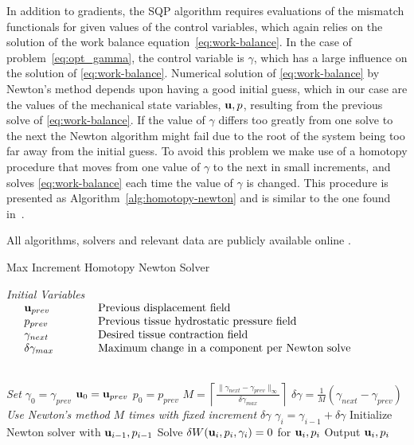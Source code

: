 In addition to gradients, the SQP algorithm requires evaluations of
the mismatch functionals for given values of the control variables,
which again relies on the solution of the work balance
equation~\eqref{eq:work-balance}. In the case of
problem~\eqref{eq:opt_gamma}, the control variable is $\gamma$, which
has a large influence on the solution of \eqref{eq:work-balance}.
Numerical solution of \eqref{eq:work-balance} by Newton's method
depends upon having a good initial guess, which in our case are the
values of the mechanical state variables, $\mathbf{u}, p$, resulting from
the previous solve of \eqref{eq:work-balance}. If the value of
$\gamma$ differs too greatly from one solve to the next the Newton
algorithm might fail due to the root of the system being too far away
from the initial guess. To avoid this problem we make use of a
homotopy procedure that moves from one value of $\gamma$ to the next
in small increments, and solves \eqref{eq:work-balance} each time the
value of $\gamma$ is changed.  This procedure is presented as
Algorithm~\ref{alg:homotopy-newton} and is similar to the one found
in~\cite{pezzuto2014orthotropic}. 

All algorithms, solvers and relevant data are
publicly available online \cite{OurPackage}.

\begin{algorithm}
\caption{Max Increment Homotopy Newton Solver}
\label{alg:homotopy-newton}
  \begin{algorithmic}
   \State \emph{Initial Variables}
   \State $\begin{array}{ll}
    \quad \mathbf{u}_{prev} & \quad \quad \quad  \mbox{Previous displacement field} \\
    \quad p_{prev} & \quad \quad \quad  \mbox{Previous tissue hydrostatic pressure field} \\
    \quad \gamma_{next} & \quad \quad \quad  \mbox{Desired tissue contraction field} \\
    \quad \delta \gamma_{max} & \quad \quad \quad  \mbox{Maximum change in a component per Newton solve}
   \end{array}$

   \\
   \State \emph{Set}
   \State \quad $\gamma_0 = \gamma_{prev}$
   \State \quad $\mathbf{u}_0 = \mathbf{u}_{prev}$
   \State \quad  $p_0 = p_{prev}$
   \State \quad  $M = \left \lceil \frac{\|\gamma_{next} - \gamma_{prev}\|_{\infty}}{\delta \gamma_{max}} \right \rceil$
   \State \quad $\delta \gamma = \frac{1}{M}(\gamma_{next} - \gamma_{prev})$
   \\
   \State \emph{Use Newton's method $M$ times with fixed increment $\delta \gamma$}
      \State $\gamma_i = \gamma_{i -1} + \delta \gamma$
      \State Initialize Newton solver with $\mathbf{u}_{i -1}, p_{i -1}$
      \State Solve $\delta W(\mathbf{u}_i, p_i, \gamma_i) = 0$ for $\mathbf{u}_i, p_i$
   \EndFor
   \State Output $\mathbf{u}_i, p_i$
  \end{algorithmic}
\end{algorithm}

